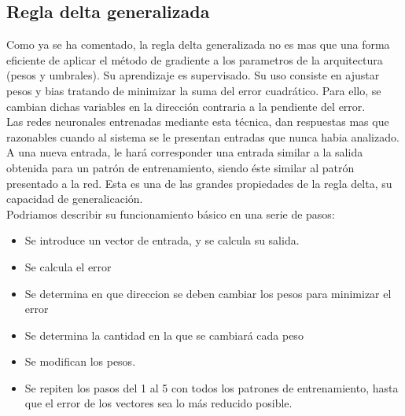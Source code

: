 \subsection{Regla delta generalizada}
Como ya se ha comentado, la regla delta generalizada no es mas que una forma eficiente de aplicar el método de gradiente a los parametros de la arquitectura (pesos y umbrales). Su aprendizaje es supervisado. Su uso consiste en ajustar pesos y bias tratando de minimizar la suma del error cuadrático. Para ello, se cambian dichas variables en la dirección contraria a la pendiente del error.\\
Las redes neuronales entrenadas mediante esta técnica, dan respuestas mas que razonables cuando al sistema se le presentan entradas que nunca habia analizado. A una nueva entrada, le hará corresponder una entrada similar a la salida obtenida para un patrón de entrenamiento, siendo éste similar al patrón presentado a la red. Esta es una de las grandes propiedades de la regla delta, su capacidad de generalicación.\\
Podriamos describir su funcionamiento básico en una serie de pasos:
\begin{itemize}
\item Se introduce un vector de entrada, y se calcula su salida.
\item Se calcula el error
\item Se determina en que direccion se deben cambiar los pesos para minimizar el error
\item Se determina la cantidad en la que se cambiará cada peso
\item Se modifican los pesos.
\item Se repiten los pasos del 1 al 5 con todos los patrones de entrenamiento, hasta que el error de los vectores sea lo más reducido posible.
\end{itemize}

